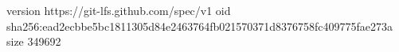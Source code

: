 version https://git-lfs.github.com/spec/v1
oid sha256:ead2ecbbe5bc1811305d84e2463764fb021570371d8376758fc409775fae273a
size 349692
